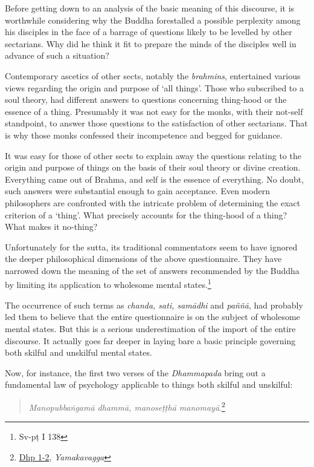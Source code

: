Before getting down to an analysis of the basic meaning of this discourse, it is worthwhile considering why the Buddha forestalled a possible perplexity among his disciples in the face of a barrage of questions likely to be levelled by other sectarians. Why did he think it fit to prepare the minds of the disciples well in advance of such a situation?

Contemporary ascetics of other sects, notably the \emph{brahmins}, entertained various views regarding the origin and purpose of `all things'. Those who subscribed to a soul theory, had different answers to questions concerning thing-hood or the essence of a thing. Presumably it was not easy for the monks, with their not-self standpoint, to answer those questions to the satisfaction of other sectarians. That is why those monks confessed their incompetence and begged for guidance.

It was easy for those of other sects to explain away the questions relating to the origin and purpose of things on the basis of their soul theory or divine creation. Everything came out of Brahma, and self is the essence of everything. No doubt, such answers were substantial enough to gain acceptance. Even modern philosophers are confronted with the intricate problem of determining the exact criterion of a `thing'. What precisely accounts for the thing-hood of a thing? What makes it no-thing?

Unfortunately for the sutta, its traditional commentators seem to have ignored the deeper philosophical dimensions of the above questionnaire. They have narrowed down the meaning of the set of answers recommended by the Buddha by limiting its application to wholesome mental states.\footnote{Sv-pṭ I 138}

The occurrence of such terms as \emph{chanda, sati, samādhi} and \emph{paññā}, had probably led them to believe that the entire questionnaire is on the subject of wholesome mental states. But this is a serious underestimation of the import of the entire discourse. It actually goes far deeper in laying bare a basic principle governing both skilful and unskilful mental states.

Now, for instance, the first two verses of the \emph{Dhammapada} bring out a fundamental law of psychology applicable to things both skilful and unskilful:

\begin{quote}
\emph{Manopubbaṅgamā dhammā, manoseṭṭhā manomayā}.\footnote{\href{https://suttacentral.net/dhp1-20/pli/ms}{Dhp 1-2}, \emph{Yamakavagga}}
\end{quote}

